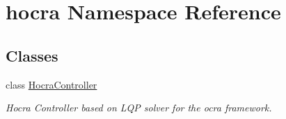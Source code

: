 \hypertarget{namespacehocra}{}\section{hocra Namespace Reference}
\label{namespacehocra}
\subsection*{Classes}
\begin{DoxyCompactItemize}
\item 
class \hyperlink{classhocra_1_1HocraController}{Hocra\+Controller}
\begin{DoxyCompactList}\small\item\em Hocra Controller based on L\+QP solver for the ocra framework. \end{DoxyCompactList}\end{DoxyCompactItemize}
